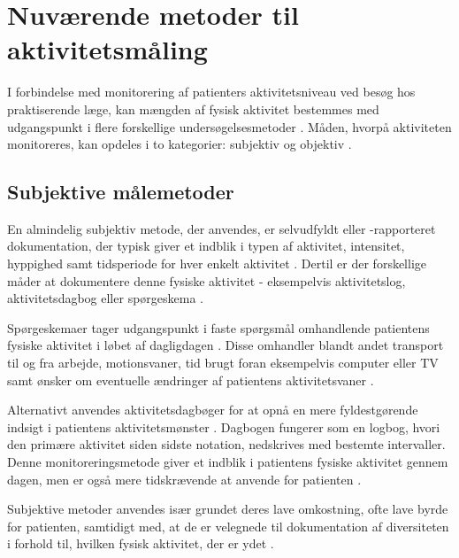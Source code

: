 \section{Nuværende metoder til aktivitetsmåling} \label{NuMetode}

I forbindelse med monitorering af patienters aktivitetsniveau ved besøg hos praktiserende læge, kan mængden af fysisk aktivitet bestemmes med udgangspunkt i flere forskellige undersøgelsesmetoder \citep{motionsraad2007}. 
Måden, hvorpå aktiviteten monitoreres, kan opdeles i to kategorier: subjektiv og objektiv \citep{motionsraad2007, adamo2009}. 
 
\subsection{Subjektive målemetoder}

En almindelig subjektiv metode, der anvendes, er selvudfyldt eller -rapporteret dokumentation, der typisk giver et indblik i typen af aktivitet, intensitet, hyppighed samt tidsperiode for hver enkelt aktivitet \citep{adamo2009}. Dertil er der forskellige måder at dokumentere denne fysiske aktivitet - eksempelvis aktivitetslog, aktivitetsdagbog eller spørgeskema \citep{adamo2009}. 


Spørgeskemaer tager udgangspunkt i faste spørgsmål omhandlende patientens fysiske aktivitet i løbet af dagligdagen \citep{muller2009}. 
Disse omhandler blandt andet transport til og fra arbejde, motionsvaner, tid brugt foran eksempelvis computer eller TV samt ønsker om eventuelle ændringer af patientens aktivitetsvaner \citep{motionsraad2007, vestergaard2012}. 

Alternativt anvendes aktivitetsdagbøger for at opnå en mere fyldestgørende indsigt i patientens aktivitetsmønster \citep{motionsraad2007,muller2009}. 
Dagbogen fungerer som en logbog, hvori den primære aktivitet siden sidste notation, nedskrives med bestemte intervaller. 
Denne monitoreringsmetode giver et indblik i patientens fysiske aktivitet gennem dagen, men er også mere tidskrævende at anvende for patienten \citep{motionsraad2007}.


Subjektive metoder anvendes især grundet deres lave omkostning, ofte lave byrde for patienten, samtidigt med, at de er velegnede til dokumentation af diversiteten i forhold til, hvilken fysisk aktivitet, der er ydet \citep{adamo2009}.

